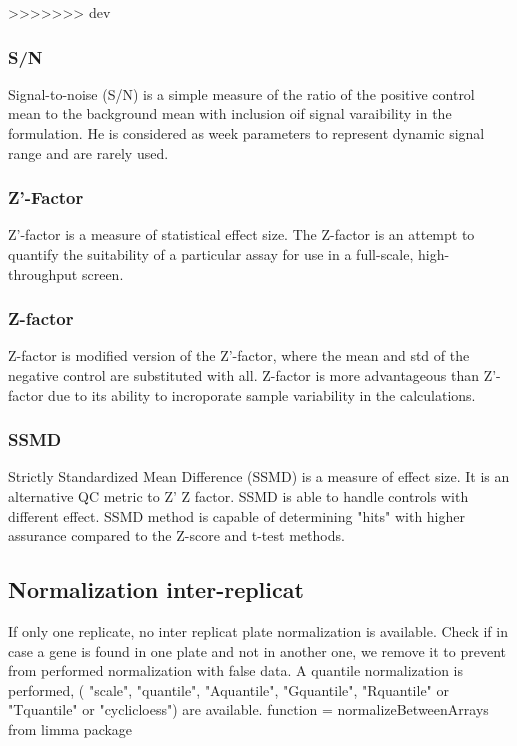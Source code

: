 \documentclass[a4paper,10pt]{article}
\begin{document}
\bigskip
>>>>>>> dev

\subsubsection*{S/N}


Signal-to-noise (S/N) is a simple measure of the ratio of the positive control mean to the background mean with inclusion oif signal
varaibility in the formulation. He is considered as week parameters to represent dynamic signal range and are rarely used.

\subsubsection*{Z'-Factor}


Z'-factor is a measure of statistical effect size. The Z-factor is an attempt to quantify the suitability of a particular assay for
 use in a full-scale, high-throughput screen.

\subsubsection*{Z-factor}


Z-factor is modified version of the Z'-factor, where the mean and std of the negative control are substituted with all. Z-factor is
more advantageous than Z'-factor due to its ability to incroporate sample variability in the calculations.

\subsubsection*{SSMD}


Strictly Standardized Mean Difference (SSMD) is a measure of effect size.
It is an alternative QC metric to Z' Z factor. SSMD is able to handle controls with different effect. SSMD method is capable
of determining "hits" with higher assurance compared to the Z-score and t-test methods.

\newpage

\subsection*{Normalization inter-replicat}


If only one replicate, no inter replicat plate normalization is available. Check if in case a gene is found in one plate and not 
in another one, we remove it to prevent from performed normalization with false data.
A quantile normalization is performed, ( "scale", "quantile", "Aquantile", "Gquantile", "Rquantile" or "Tquantile" 
or "cyclicloess") are available. function = normalizeBetweenArrays from limma package
\end{document}
